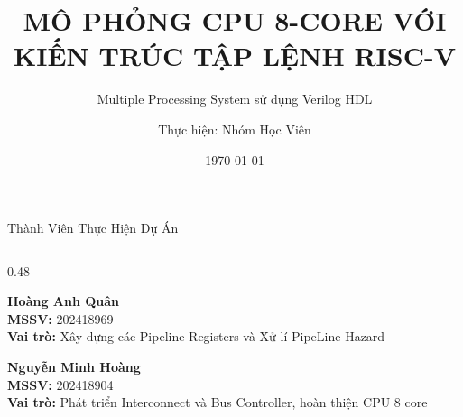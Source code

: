 \documentclass[10pt, aspectratio=169]{beamer}
\title[Mô phỏng CPU 8-Core RISC-V]{\textbf{MÔ PHỎNG CPU 8-CORE VỚI KIẾN TRÚC TẬP LỆNH RISC-V}}
\subtitle{Multiple Processing System sử dụng Verilog HDL}
\author[Nhóm Dự Án]{Thực hiện: Nhóm Học Viên}
\institute[Hội Đồng]{Báo Cáo Tiến Độ Dự Án Kiến Trúc Máy Tính}
\date{\today}
\begin{document}
{
\begin{frame}[plain]
  \titlepage
\end{frame}}

\begin{frame}{Thành Viên Thực Hiện Dự Án}
  \centering
  \vspace{0.4cm}

  \begin{columns}[T]
    \begin{column}{0.48\textwidth}
      \centering
      \begin{minipage}{\textwidth}
        \centering
        \colorbox{DeepBlue!5}{
          \begin{minipage}[t][2.2cm][c]{0.95\textwidth}
            \centering
            \vspace{0.15cm}
            {\large\bfseries\color{DeepBlue} Hoàng Anh Quân} \\
            \vspace{0.15cm}
            \scriptsize
            \textbf{MSSV:} 202418969 \\
            \textbf{Vai trò:} Xây dựng các Pipeline Registers và Xử lí PipeLine Hazard
          \end{minipage}
        }
      \end{minipage}

      \vspace{0.5cm}

      \begin{minipage}{\textwidth}
        \centering
        \colorbox{DeepBlue!5}{
          \begin{minipage}[t][2.2cm][c]{0.95\textwidth}
            \centering
            \vspace{0.15cm}
            {\large\bfseries\color{DeepBlue} Nguyễn Minh Hoàng} \\
            \vspace{0.15cm}
            \scriptsize
            \textbf{MSSV:} 202418904 \\
            \textbf{Vai trò:} Phát triển Interconnect và Bus Controller, hoàn thiện CPU 8 core
          \end{minipage}
        }
      \end{minipage}
    \end{column}


\end{columns}
\end{frame}
\end{document}

